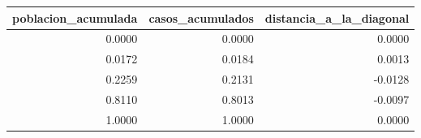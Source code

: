 \begin{tabular}{rrr}
\toprule
poblacion\_acumulada & casos\_acumulados & distancia\_a\_la\_diagonal \\
\midrule
0.0000 & 0.0000 & 0.0000 \\
0.0172 & 0.0184 & 0.0013 \\
0.2259 & 0.2131 & -0.0128 \\
0.8110 & 0.8013 & -0.0097 \\
1.0000 & 1.0000 & 0.0000 \\
\bottomrule
\end{tabular}
